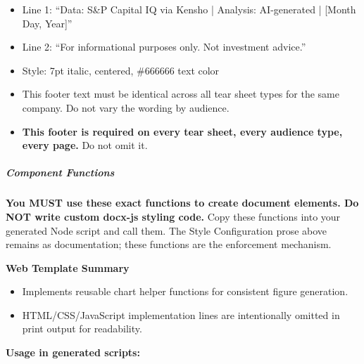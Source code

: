 \documentclass[11pt]{article}
\begin{document}
\begin{itemize}[leftmargin=*,itemsep=2pt,topsep=2pt]
\item {} Line 1: ``Data: S\&P Capital IQ via Kensho | Analysis: AI-generated | [Month Day, Year]''
\item {} Line 2: ``For informational purposes only. Not investment advice.''
\item {} Style: 7pt italic, centered, \#666666 text color
\item {} This footer text must be identical across all tear sheet types for the same company. Do not vary the wording by audience.
\item {} \textbf{This footer is required on every tear sheet, every audience type, every page.} Do not omit it.
\end{itemize}

\subparagraph{Component Functions}\mbox{}\par

\textbf{You MUST use these exact functions to create document elements. Do NOT write custom docx-js styling code.} Copy these functions into your generated Node script and call them. The Style Configuration prose above remains as documentation; these functions are the enforcement mechanism.


\textbf{Web Template Summary}
\begin{itemize}[leftmargin=*,itemsep=2pt,topsep=2pt]
\item {} Implements reusable chart helper functions for consistent figure generation.
\item {} HTML/CSS/JavaScript implementation lines are intentionally omitted in print output for readability.
\end{itemize}

\textbf{Usage in generated scripts:}
\end{document}
